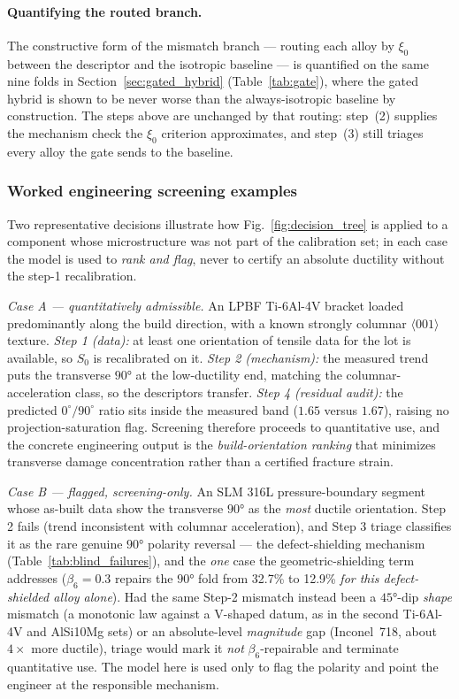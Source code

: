 \paragraph{Quantifying the routed branch.}
The constructive form of the mismatch branch --- routing each alloy by $\xi_0$ between the descriptor and the isotropic baseline --- is quantified on the same nine folds in Section~\ref{sec:gated_hybrid} (Table~\ref{tab:gate}), where the gated hybrid is shown to be never worse than the always-isotropic baseline by construction. The steps above are unchanged by that routing: step~(2) supplies the mechanism check the $\xi_0$ criterion approximates, and step~(3) still triages every alloy the gate sends to the baseline.


\subsubsection{Worked engineering screening examples}

Two representative decisions illustrate how Fig.~\ref{fig:decision_tree} is applied to a component whose microstructure was not part of the calibration set; in each case the model is used to \emph{rank and flag}, never to certify an absolute ductility without the step-1 recalibration.

\emph{Case A --- quantitatively admissible.} An LPBF Ti-6Al-4V bracket loaded predominantly along the build direction, with a known strongly columnar $\langle001\rangle$ texture. \emph{Step 1 (data): }at least one orientation of tensile data for the lot is available, so $S_0$ is recalibrated on it. \emph{Step 2 (mechanism): }the measured trend puts the transverse $\ang{90}$ at the low-ductility end, matching the columnar-acceleration class, so the descriptors transfer. \emph{Step 4 (residual audit): }the predicted $0^\circ/90^\circ$ ratio sits inside the measured band ($1.65$ versus $1.67$), raising no projection-saturation flag. Screening therefore proceeds to quantitative use, and the concrete engineering output is the \emph{build-orientation ranking} that minimizes transverse damage concentration rather than a certified fracture strain.

\emph{Case B --- flagged, screening-only.} An SLM 316L pressure-boundary segment whose as-built data show the transverse $\ang{90}$ as the \emph{most} ductile orientation. Step 2 fails (trend inconsistent with columnar acceleration), and Step 3 triage classifies it as the rare genuine $\ang{90}$ polarity reversal --- the defect-shielding mechanism (Table~\ref{tab:blind_failures}), and the \emph{one} case the geometric-shielding term addresses ($\beta_6 = 0.3$ repairs the $\ang{90}$ fold from 32.7\% to 12.9\% \emph{for this defect-shielded alloy alone}). Had the same Step-2 mismatch instead been a $\ang{45}$-dip \emph{shape} mismatch (a monotonic law against a V-shaped datum, as in the second Ti-6Al-4V and AlSi10Mg sets) or an absolute-level \emph{magnitude} gap (Inconel~718, about $4\times$ more ductile), triage would mark it \emph{not} $\beta_6$-repairable and terminate quantitative use. The model here is used only to flag the polarity and point the engineer at the responsible mechanism.


